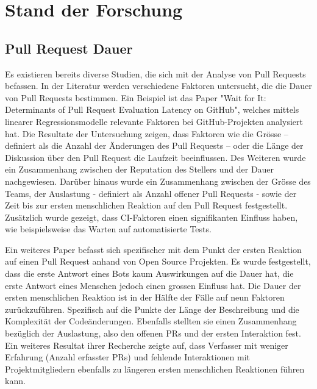 


\chapter{Stand der Forschung} %

\label{Chapter3} %


\section{Pull Request Dauer}
Es existieren bereits diverse Studien, die sich mit der Analyse von Pull Requests befassen. In der Literatur werden verschiedene Faktoren untersucht, die die Dauer von Pull Requests bestimmen. Ein Beispiel ist das Paper "Wait for It: Determinants of Pull Request Evaluation Latency on GitHub", welches  mittels linearer Regressionsmodelle relevante Faktoren bei GitHub-Projekten analysiert hat. Die Resultate der Untersuchung zeigen, dass Faktoren wie die Grösse – definiert als die Anzahl der Änderungen des Pull Requests – oder die Länge der Diskussion über den Pull Request die Laufzeit beeinflussen. Des Weiteren wurde ein Zusammenhang zwischen der Reputation des Stellers und der Dauer nachgewiesen. Darüber hinaus wurde ein Zusammenhang zwischen der Grösse des Teams, der Auslastung - definiert als Anzahl offener Pull Requests - sowie der Zeit bis zur ersten menschlichen Reaktion auf den Pull Request festgestellt. Zusätzlich wurde gezeigt, dass CI-Faktoren einen signifikanten Einfluss haben, wie beispielsweise das Warten auf automatisierte Tests. \parencite{yu_wait_2015}

Ein weiteres Paper befasst sich spezifischer mit dem Punkt der ersten Reaktion auf einen Pull Request anhand von Open Source Projekten. Es wurde festgestellt, dass die erste Antwort eines Bots kaum Auswirkungen auf die Dauer hat, die erste Antwort eines Menschen jedoch einen grossen Einfluss hat. Die Dauer der ersten menschlichen Reaktion ist in der Hälfte der Fälle auf neun Faktoren zurückzuführen. Spezifisch auf die Punkte der Länge der Beschreibung und die Komplexität der Codeänderungen. Ebenfalls stellten sie einen Zusammenhang bezüglich der Auslastung, also den offenen PRs und der ersten Interaktion fest. Ein weiteres Resultat ihrer Recherche zeigte auf, dass Verfasser mit weniger Erfahrung (Anzahl erfasster PRs) und fehlende Interaktionen mit Projektmitgliedern ebenfalls zu längeren ersten menschlichen Reaktionen führen kann.\parencite{hasan_understanding_2023} 

